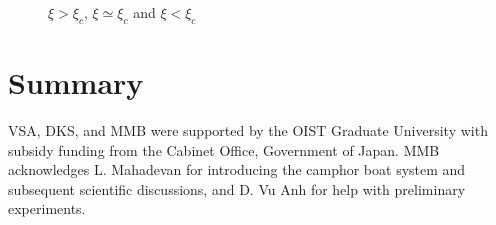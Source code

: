 \documentclass[aps, twocolumn, floatfix, superscriptaddress]{revtex4}
\begin{document}
\begin{figure}[h!]
\begin{minipage}[t]{0.3\linewidth}
	\end{minipage}
	\caption{$\xi > \xi_{c}$, $\xi \simeq \xi_{c}$ and $\xi < \xi_{c}$}\label{fig:uvst_sigma}
\end{figure}
\section{Summary}
\label{sec:summary}


\acknowledgments
VSA, DKS, and MMB were supported by the OIST Graduate University with subsidy funding from the Cabinet Office, Government of Japan. MMB acknowledges L. Mahadevan for introducing the camphor boat system and subsequent scientific discussions, and D. Vu Anh for help with preliminary experiments.


\end{document}
